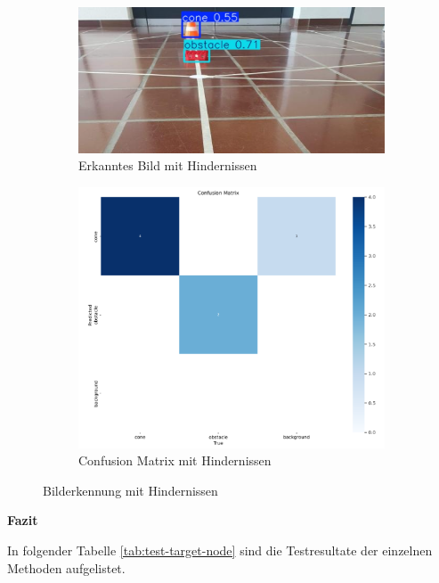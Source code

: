 \begin{figure}[H]
\centering
\begin{subfigure}{0.49\textwidth}
\centering
\includegraphics[width=0.95\linewidth]{assets/informatik-prototyp/yolo/cone-obst-recognition.png} 
\caption{Erkanntes Bild mit Hindernissen}
\label{fig:image-recognition-with-cone-obst}
\end{subfigure}
\begin{subfigure}{0.49\textwidth}
\centering
\includegraphics[width=0.95\linewidth]{assets/informatik-prototyp/yolo/cone-obst-conf-matrix.png} 
\caption{Confusion Matrix mit Hindernissen}
\label{fig:conf-matrix-cone-obst}
\end{subfigure}
\caption{Bilderkennung mit Hindernissen}
\label{fig:recognition-with-cone-obst}
\end{figure}



\textbf{Fazit}

In folgender Tabelle \ref{tab:test-target-node} sind die Testresultate der einzelnen Methoden aufgelistet.


